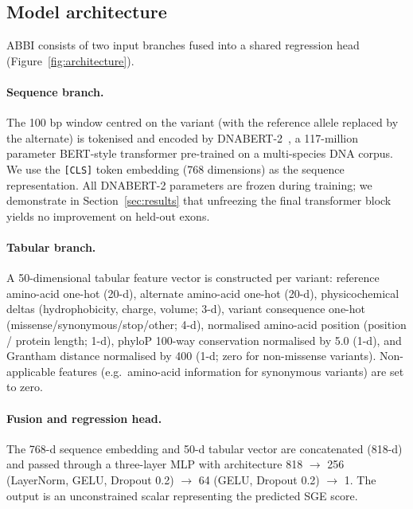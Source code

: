 \documentclass[12pt]{article}
\newcommand{\abbi}{\textsc{ABBI}}
\begin{document}
\subsection{Model architecture}

\abbi{} consists of two input branches fused into a shared regression head
(Figure~\ref{fig:architecture}).

\paragraph{Sequence branch.}
The 100 bp window centred on the variant (with the reference allele replaced by the
alternate) is tokenised and encoded by DNABERT-2~\citep{dnabert2}, a 117-million
parameter BERT-style transformer pre-trained on a multi-species DNA corpus.
We use the \texttt{[CLS]} token embedding (768 dimensions) as the sequence
representation.
All DNABERT-2 parameters are frozen during training; we demonstrate in
Section~\ref{sec:results} that unfreezing the final transformer block yields no
improvement on held-out exons.

\paragraph{Tabular branch.}
A 50-dimensional tabular feature vector is constructed per variant:
reference amino-acid one-hot (20-d), alternate amino-acid one-hot (20-d),
physicochemical deltas (hydrophobicity, charge, volume; 3-d),
variant consequence one-hot (missense/synonymous/stop/other; 4-d),
normalised amino-acid position (position / protein length; 1-d),
phyloP 100-way conservation normalised by 5.0 (1-d),
and Grantham distance normalised by 400 (1-d; zero for non-missense variants).
Non-applicable features (e.g.\ amino-acid information for synonymous variants) are
set to zero.

\paragraph{Fusion and regression head.}
The 768-d sequence embedding and 50-d tabular vector are concatenated (818-d) and
passed through a three-layer MLP with architecture
818 $\to$ 256 (LayerNorm, GELU, Dropout 0.2) $\to$ 64 (GELU, Dropout 0.2) $\to$ 1.
The output is an unconstrained scalar representing the predicted SGE score.
\end{document}
